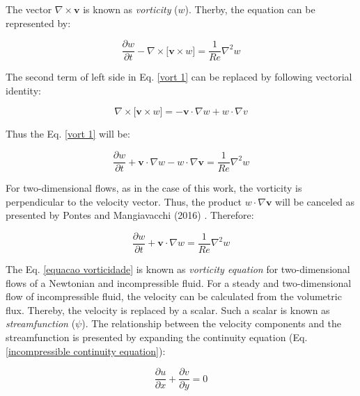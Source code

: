 \medskip
The vector $\nabla \times \textbf{v}$ is known as
\textit{vorticity} ($w$).
Therby, the equation can be represented by:

\begin{equation} \label{vort 1}
 \frac{\partial w}{\partial t}
 - 
 \nabla \times \big[ \textbf{v} \times w \big]
 =
 \frac{1}{Re} \nabla^{2} w
\end{equation}

\medskip
The second term of left side in 
Eq. \ref{vort 1}
can be replaced by following vectorial identity:


\begin{equation}
 \nabla \times \big[ \textbf{v} \times w \big]
 =
 -
 \textbf{v} \cdot \nabla w
 +
 w \cdot \nabla v
\end{equation}

\medskip
\noindent
Thus the Eq. \ref{vort 1} will be:

\begin{equation} \label{vort 2}
 \frac{\partial w}{\partial t}
 +
 \textbf{v} \cdot \nabla w
 - 
 w \cdot \nabla \textbf{v}
 =
 \frac{1}{Re} \nabla^{2} w
\end{equation}

\medskip
For two-dimensional flows, as in the case of this work,
 the vorticity is perpendicular to the velocity vector.
 Thus, the product $w \cdot \nabla \textbf{v}$ will be canceled
 as presented by Pontes and Mangiavacchi (2016) \cite{pontes2016}.
 Therefore:

\begin{equation} \label{equacao vorticidade}
 \frac{\partial w}{\partial t}
 +
 \textbf{v} \cdot \nabla w
 =
 \frac{1}{Re} \nabla^{2} w
\end{equation}

\medskip
The Eq. \ref{equacao vorticidade} is known as
 \textit{vorticity equation} for two-dimensional flows of
 a Newtonian and incompressible fluid. For a steady and 
 two-dimensional flow of incompressible fluid,
 the velocity can be calculated from the volumetric flux.
 Thereby, the velocity is replaced by a scalar.
 Such a scalar is known as \textit{streamfunction} ($\psi$).
 The relationship between the velocity components and
 the streamfunction is presented by expanding the
 continuity equation (Eq. \ref{incompressible continuity equation}):

\begin{equation} \label{cor 1}
 \frac{\partial u}{\partial x}
 +
 \frac{\partial v}{\partial y}
 =
 0
\end{equation}
 
